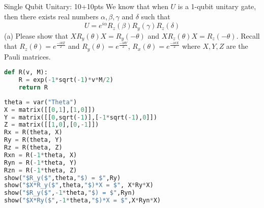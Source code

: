 \documentclass[12pt]{article}
\makeatletter
\newcommand{\<}{\langle}
\renewcommand{\>}{\rangle}
\newenvironment{problem}{\@startsection
       {section}
       {1}
       {-.2em}
       {-3.5ex plus -1ex minus -.2ex}
       {2.3ex plus .2ex}
       {\pagebreak[3]
       \large\bf\noindent{Problem }
       }
       }
       {%
       \begin{center}\large\bf \end{center}}
\makeatother
\begin{document}
\begin{problem}{Single Qubit Unitary: 10+10pts}
We know that when $U$ is a 1-qubit unitary gate, then there exists real numbers $\alpha, \beta, \gamma$ and $\delta$ such that 
\[
	U = e^{i\alpha} R_z (\beta) R_{y}(\gamma) R_z(\delta)
\]
(a) Please show that $XR_y(\theta)X = R_y(-\theta)$ and $XR_z(\theta)X = R_z(-\theta)$. Recall that $R_z(\theta) = e^{\frac{-i\theta Z}{2}}$ and $R_y(\theta) = e^{\frac{-i\theta Y}{2}}$, $R_x(\theta) = e^{\frac{-i\theta X}{2}}$ where $X, Y, Z$ are the Pauli matrices. \\ 
\begin{lstlisting}[language=Python]
def R(v, M):
    R = exp(-1*sqrt(-1)*v*M/2)
    return R
\end{lstlisting}

\begin{lstlisting}[language=Python]
theta = var("Theta")
X = matrix([[0,1],[1,0]])
Y = matrix([[0,sqrt(-1)],[-1*sqrt(-1),0]])
Z = matrix([[1,0],[0,-1]])
Rx = R(theta, X)
Ry = R(theta, Y)
Rz = R(theta, Z)
Rxn = R(-1*theta, X)
Ryn = R(-1*theta, Y)
Rzn = R(-1*theta, Z)
show("$R_y($",theta,"$) = $",Ry)
show("$X*R_y($",theta,"$)*X = $", X*Ry*X)
show("$R_y($",-1*theta,"$) = $",Ryn)
show("$X*Ry($",-1*theta,"$)*X = $",X*Ryn*X)
\end{lstlisting}


\end{problem}
\end{document}
